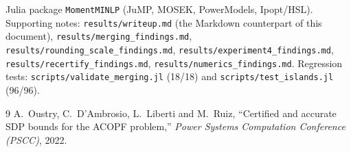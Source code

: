 \documentclass[11pt]{article}
\newcommand{\code}[1]{\texttt{\small #1}}
\begin{document}
Julia package \code{MomentMINLP} (JuMP, MOSEK, PowerModels, Ipopt/HSL). Supporting notes:
\code{results/writeup.md} (the Markdown counterpart of this document),
\code{results/merging\_findings.md}, \code{results/rounding\_scale\_findings.md},
\code{results/experiment4\_findings.md}, \code{results/recertify\_findings.md},
\code{results/numerics\_findings.md}. Regression tests: \code{scripts/validate\_merging.jl} (18/18) and
\code{scripts/test\_islands.jl} (96/96).

\begin{thebibliography}{9}
A.~Oustry, C.~D'Ambrosio, L.~Liberti and M.~Ruiz,
\newblock ``Certified and accurate SDP bounds for the ACOPF problem,''
\newblock \emph{Power Systems Computation Conference (PSCC)}, 2022.
\end{thebibliography}
\end{document}
